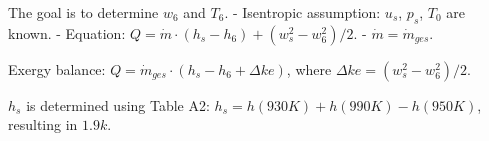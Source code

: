 The goal is to determine \( w_6 \) and \( T_6 \).  
- Isentropic assumption: \( u_s \), \( p_s \), \( T_0 \) are known.  
- Equation: \( Q = \dot{m} \cdot (h_s - h_6) + (w_s^2 - w_6^2) / 2 \).  
- \( \dot{m} = \dot{m}_{ges} \).  

Exergy balance:  
\( Q = \dot{m}_{ges} \cdot (h_s - h_6 + \Delta ke) \), where \( \Delta ke = (w_s^2 - w_6^2) / 2 \).  

\( h_s \) is determined using Table A2:  
\( h_s = h(930K) + h(990K) - h(950K) \), resulting in \( 1.9k \).